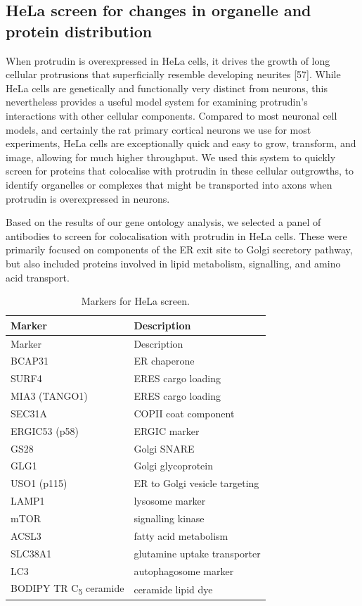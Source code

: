 \documentclass[
  12pt,
  a4paper,
]{book}
\begin{document}
\hypertarget{hela-screen-for-changes-in-organelle-and-protein-distribution}{%
\subsection{HeLa screen for changes in organelle and protein distribution}\label{hela-screen-for-changes-in-organelle-and-protein-distribution}}

When protrudin is overexpressed in HeLa cells, it drives the growth of long cellular protrusions that superficially resemble developing neurites {[}57{]}. While HeLa cells are genetically and functionally very distinct from neurons, this nevertheless provides a useful model system for examining protrudin's interactions with other cellular components. Compared to most neuronal cell models, and certainly the rat primary cortical neurons we use for most experiments, HeLa cells are exceptionally quick and easy to grow, transform, and image, allowing for much higher throughput. We used this system to quickly screen for proteins that colocalise with protrudin in these cellular outgrowths, to identify organelles or complexes that might be transported into axons when protrudin is overexpressed in neurons.

Based on the results of our gene ontology analysis, we selected a panel of antibodies to screen for colocalisation with protrudin in HeLa cells. These were primarily focused on components of the ER exit site to Golgi secretory pathway, but also included proteins involved in lipid metabolism, signalling, and amino acid transport.

\begin{longtable}[]{@{}ll@{}}
\caption{\label{tab:unnamed-chunk-1}Markers for HeLa screen.}\tabularnewline
\toprule()
Marker & Description \\
\midrule()
\endfirsthead
\toprule()
Marker & Description \\
\midrule()
\endhead
BCAP31 & ER chaperone \\
SURF4 & ERES cargo loading \\
MIA3 (TANGO1) & ERES cargo loading \\
SEC31A & COPII coat component \\
ERGIC53 (p58) & ERGIC marker \\
GS28 & Golgi SNARE \\
GLG1 & Golgi glycoprotein \\
USO1 (p115) & ER to Golgi vesicle targeting \\
LAMP1 & lysosome marker \\
mTOR & signalling kinase \\
ACSL3 & fatty acid metabolism \\
SLC38A1 & glutamine uptake transporter \\
LC3 & autophagosome marker \\
BODIPY TR C\textsubscript{5} ceramide & ceramide lipid dye \\
\bottomrule()
\end{longtable}
\end{document}
